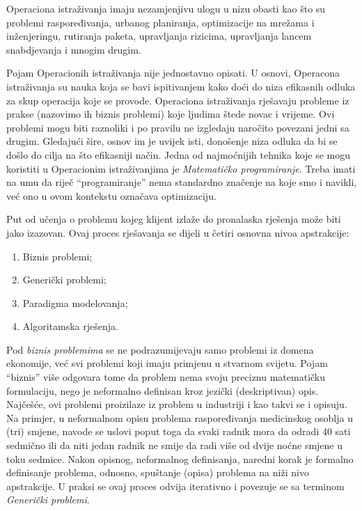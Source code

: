 \documentclass[a4paper, utf8, 11pt, colorlinks]{book}
\begin{document}
 Operaciona istraživanja imaju nezamjenjivu ulogu u nizu obasti kao što su problemi raspoređivanja, urbanog planiranja, optimizacije na mrežama i inženjeringu, rutiranja paketa, upravljanja rizicima, upravljanja lancem snabdjevanja i mnogim drugim. 

Pojam Operacionih istraživanja nije jednostavno opisati. U osnovi, Operacona istraživanja su nauka koja se bavi ispitivanjem kako doći do niza efikasnih odluka za skup operacija koje se provode. Operaciona istraživanja rješavaju probleme iz prakse (nazovimo ih biznis problemi) koje ljudima štede novac i vrijeme. Ovi problemi mogu biti raznoliki i po pravilu ne izgledaju naročito povezani jedni sa drugim. Gledajući šire, osnov  im je uvijek isti, donošenje niza odluka da bi se došlo do cilja na što efikasniji način.
Jedna od najmoćnijih tehnika koje se mogu koristiti u Operacionim istraživanjima je \emph{Matematičko programiranje}. Treba imati na umu da riječ ``programiranje'' nema standardno značenje na koje smo i navikli, već ono u ovom kontekstu označava optimizaciju.   %

  Put od učenja o problemu kojeg klijent izlaže do pronalaska rješenja može biti jako izazovan. Ovaj proces rješavanja se  dijeli u četiri osnovna nivoa apstrakcije:
  \begin{enumerate}
      \item Biznis problemi;
      \item Generički problemi; 
      \item Paradigma modelovanja;
      \item Algoritamska rješenja. 
  \end{enumerate}
  
 Pod \emph{biznis problemima}  se ne podrazumijevaju samo problemi iz domena ekonomije, već svi problemi koji imaju primjenu u stvarnom svijetu. Pojam ``biznis'' više odgovara tome da problem nema svoju preciznu matematičku formulaciju, nego je neformalno definisan kroz jezički (deskriptivan) opis.  Najčešće, ovi problemi proizilaze iz problem u industriji i kao takvi se i opisuju. Na primjer, u neformalnom opisu problema raspoređivanja medicinskog osoblja u (tri) smjene, navode se uslovi poput toga da svaki radnik mora da odradi 40 sati sedmično ili da niti jedan radnik ne smije da radi više od dvije noćne smjene u toku sedmice. Nakon opisnog, neformalnog definisanja, naredni korak 
 je formalno definisanje problema, odnosno, spuštanje (opisa) problema na niži nivo apstrakcije. U praksi se ovaj proces odvija iterativno i povezuje se sa terminom \emph{Generički problemi}. 
\end{document}
